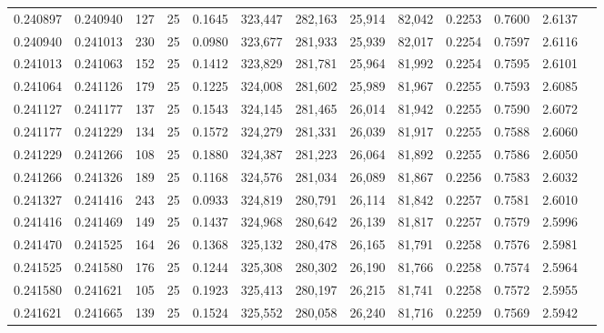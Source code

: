 \begin{tabular}{rrrrrrrrrrrrr}
0.240897 & 0.240940 &   127 &  25 &                                     0.1645 & 323,447 & 282,163 &  25,914 &  82,042 & 0.2253 & 0.7600 & 2.6137 \\
0.240940 & 0.241013 &   230 &  25 &                                     0.0980 & 323,677 & 281,933 &  25,939 &  82,017 & 0.2254 & 0.7597 & 2.6116 \\
0.241013 & 0.241063 &   152 &  25 &                                     0.1412 & 323,829 & 281,781 &  25,964 &  81,992 & 0.2254 & 0.7595 & 2.6101 \\
0.241064 & 0.241126 &   179 &  25 &                                     0.1225 & 324,008 & 281,602 &  25,989 &  81,967 & 0.2255 & 0.7593 & 2.6085 \\
0.241127 & 0.241177 &   137 &  25 &                                     0.1543 & 324,145 & 281,465 &  26,014 &  81,942 & 0.2255 & 0.7590 & 2.6072 \\
0.241177 & 0.241229 &   134 &  25 &                                     0.1572 & 324,279 & 281,331 &  26,039 &  81,917 & 0.2255 & 0.7588 & 2.6060 \\
0.241229 & 0.241266 &   108 &  25 &                                     0.1880 & 324,387 & 281,223 &  26,064 &  81,892 & 0.2255 & 0.7586 & 2.6050 \\
0.241266 & 0.241326 &   189 &  25 &                                     0.1168 & 324,576 & 281,034 &  26,089 &  81,867 & 0.2256 & 0.7583 & 2.6032 \\
0.241327 & 0.241416 &   243 &  25 &                                     0.0933 & 324,819 & 280,791 &  26,114 &  81,842 & 0.2257 & 0.7581 & 2.6010 \\
0.241416 & 0.241469 &   149 &  25 &                                     0.1437 & 324,968 & 280,642 &  26,139 &  81,817 & 0.2257 & 0.7579 & 2.5996 \\
0.241470 & 0.241525 &   164 &  26 &                                     0.1368 & 325,132 & 280,478 &  26,165 &  81,791 & 0.2258 & 0.7576 & 2.5981 \\
0.241525 & 0.241580 &   176 &  25 &                                     0.1244 & 325,308 & 280,302 &  26,190 &  81,766 & 0.2258 & 0.7574 & 2.5964 \\
0.241580 & 0.241621 &   105 &  25 &                                     0.1923 & 325,413 & 280,197 &  26,215 &  81,741 & 0.2258 & 0.7572 & 2.5955 \\
0.241621 & 0.241665 &   139 &  25 &                                     0.1524 & 325,552 & 280,058 &  26,240 &  81,716 & 0.2259 & 0.7569 & 2.5942 \\

\end{tabular}
